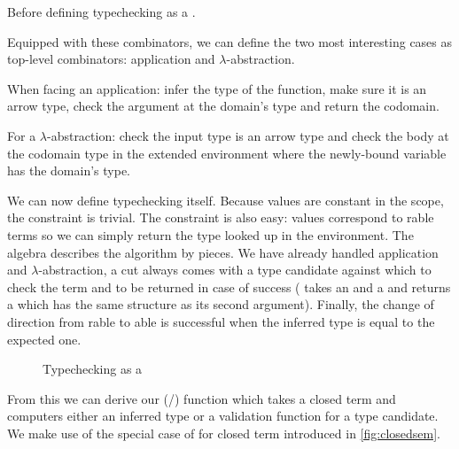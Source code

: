 
Before defining typechecking as a .


Equipped with these combinators, we can define the two most interesting cases
as top-level combinators: application and $\lambda$-abstraction.

When facing an application: infer the type of the function, make sure it is an
arrow type, check the argument at the domain's type and return the codomain.


For a $\lambda$-abstraction: check the input type is an arrow type and check
the body at the codomain type in the extended environment where the newly-bound
variable has the domain's type.


We can now define typechecking itself. Because values are constant in the scope,
the  constraint is trivial. The  constraint
is also easy: values correspond to rable terms so we can simply return
the type looked up in the environment. The algebra describes the algorithm by pieces.
We have already handled application and $\lambda$-abstraction, a cut always comes with
a type candidate against which to check the term  and to be returned in case of
success (\AF{\_<\$\_} takes an  and a { } and returns
a { } which has the same structure as its second argument).
Finally, the change of direction from rable to able is successful
when the inferred type is equal to the expected one.

\begin{figure}[h]
\caption{Typechecking as a }
\end{figure}

From this we can derive our (/) function which takes
a closed term and computers either an inferred type or a validation function for a
type candidate. We make use of the special case of  for closed term
introduced in \cref{fig:closedsem}.

